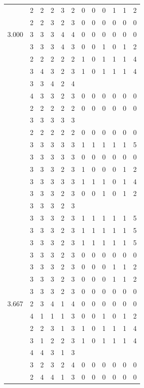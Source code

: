 \documentclass[]{msu-thesis}
\theoremstyle{definition}
\theoremstyle{definition}
\theoremstyle{definition}
\theoremstyle{remark}
\begin{document}
\begin{table}
{\begin{tabular}[t]{rrrrrrrrrrrr}
 & 2 & 2 & 2 & 3 & 2 & 0 & 0 & 0 & 1 & 1 & 2\\
 & 2 & 2 & 3 & 2 & 3 & 0 & 0 & 0 & 0 & 0 & 0\\
3.000 & 3 & 3 & 3 & 4 & 4 & 0 & 0 & 0 & 0 & 0 & 0\\
 & 3 & 3 & 3 & 4 & 3 & 0 & 0 & 1 & 0 & 1 & 2\\
 & 2 & 2 & 2 & 2 & 2 & 1 & 0 & 1 & 1 & 1 & 4\\
 & 3 & 4 & 3 & 2 & 3 & 1 & 0 & 1 & 1 & 1 & 4\\
 & 3 & 3 & 4 & 2 & 4 &  &  &  &  &  & \\
 & 4 & 3 & 3 & 2 & 3 & 0 & 0 & 0 & 0 & 0 & 0\\
 & 2 & 2 & 2 & 2 & 2 & 0 & 0 & 0 & 0 & 0 & 0\\
 & 3 & 3 & 3 & 3 & 3 &  &  &  &  &  & \\
 & 2 & 2 & 2 & 2 & 2 & 0 & 0 & 0 & 0 & 0 & 0\\
 & 3 & 3 & 3 & 3 & 3 & 1 & 1 & 1 & 1 & 1 & 5\\
 & 3 & 3 & 3 & 3 & 3 & 0 & 0 & 0 & 0 & 0 & 0\\
 & 3 & 3 & 3 & 2 & 3 & 1 & 0 & 0 & 0 & 1 & 2\\
 & 3 & 3 & 3 & 3 & 3 & 1 & 1 & 1 & 0 & 1 & 4\\
 & 3 & 3 & 3 & 2 & 3 & 0 & 0 & 1 & 0 & 1 & 2\\
 & 3 & 3 & 3 & 2 & 3 &  &  &  &  &  & \\
 & 3 & 3 & 3 & 2 & 3 & 1 & 1 & 1 & 1 & 1 & 5\\
 & 3 & 3 & 3 & 2 & 3 & 1 & 1 & 1 & 1 & 1 & 5\\
 & 3 & 3 & 3 & 2 & 3 & 1 & 1 & 1 & 1 & 1 & 5\\
 & 3 & 3 & 3 & 2 & 3 & 0 & 0 & 0 & 0 & 0 & 0\\
 & 3 & 3 & 3 & 2 & 3 & 0 & 0 & 0 & 1 & 1 & 2\\
 & 3 & 3 & 3 & 2 & 3 & 0 & 0 & 0 & 1 & 1 & 2\\
 & 3 & 3 & 3 & 2 & 3 & 0 & 0 & 0 & 0 & 0 & 0\\
3.667 & 2 & 3 & 4 & 1 & 4 & 0 & 0 & 0 & 0 & 0 & 0\\
 & 4 & 1 & 1 & 1 & 3 & 0 & 0 & 1 & 0 & 1 & 2\\
 & 2 & 2 & 3 & 1 & 3 & 1 & 0 & 1 & 1 & 1 & 4\\
 & 3 & 1 & 2 & 2 & 3 & 1 & 0 & 1 & 1 & 1 & 4\\
 & 4 & 4 & 3 & 1 & 3 &  &  &  &  &  & \\
 & 3 & 2 & 3 & 2 & 4 & 0 & 0 & 0 & 0 & 0 & 0\\
 & 2 & 4 & 4 & 1 & 3 & 0 & 0 & 0 & 0 & 0 & 0\\

\end{tabular}}
\end{table}
\end{document}
